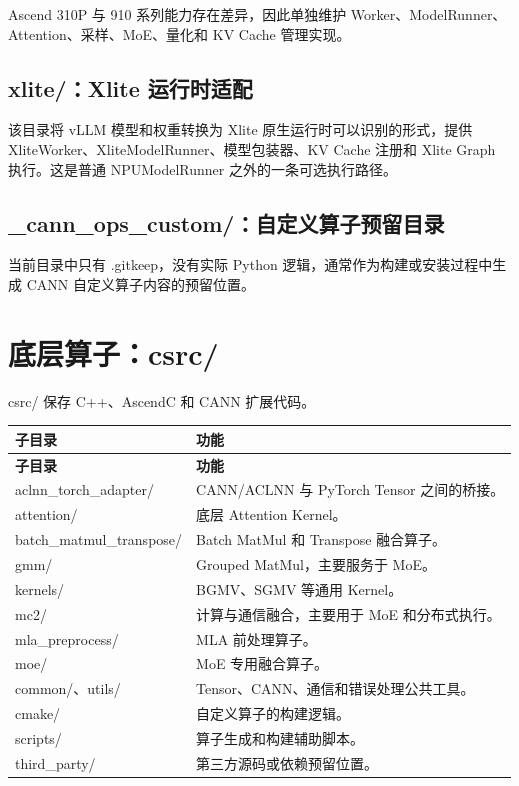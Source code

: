 \documentclass[UTF8,11pt,a4paper]{ctexart}
\DeclareRobustCommand{\folder}[1]{\texttt{\detokenize{#1}}}
\DeclareRobustCommand{\code}[1]{\texttt{\detokenize{#1}}}
\def\folder#1{#1}%
\def\code#1{#1}%
\begin{document}
Ascend 310P 与 910 系列能力存在差异，因此单独维护 Worker、ModelRunner、Attention、采样、MoE、量化和 KV Cache 管理实现。

\subsection{\folder{xlite/}：Xlite 运行时适配}

该目录将 vLLM 模型和权重转换为 Xlite 原生运行时可以识别的形式，提供 \code{XliteWorker}、\code{XliteModelRunner}、模型包装器、KV Cache 注册和 Xlite Graph 执行。这是普通 NPUModelRunner 之外的一条可选执行路径。

\subsection{\folder{_cann_ops_custom/}：自定义算子预留目录}

当前目录中只有 \folder{.gitkeep}，没有实际 Python 逻辑，通常作为构建或安装过程中生成 CANN 自定义算子内容的预留位置。

\section{底层算子：\folder{csrc/}}

\folder{csrc/} 保存 C++、AscendC 和 CANN 扩展代码。

\begin{longtable}{>{\raggedright\arraybackslash}p{} >{\raggedright\arraybackslash}p{}}
\toprule
\textbf{子目录} & \textbf{功能} \\
\midrule
\endfirsthead
\toprule
\textbf{子目录} & \textbf{功能} \\
\midrule
\endhead
\folder{aclnn_torch_adapter/} & CANN/ACLNN 与 PyTorch Tensor 之间的桥接。 \\
\folder{attention/} & 底层 Attention Kernel。 \\
\folder{batch_matmul_transpose/} & Batch MatMul 和 Transpose 融合算子。 \\
\folder{gmm/} & Grouped MatMul，主要服务于 MoE。 \\
\folder{kernels/} & BGMV、SGMV 等通用 Kernel。 \\
\folder{mc2/} & 计算与通信融合，主要用于 MoE 和分布式执行。 \\
\folder{mla_preprocess/} & MLA 前处理算子。 \\
\folder{moe/} & MoE 专用融合算子。 \\
\folder{common/}、\folder{utils/} & Tensor、CANN、通信和错误处理公共工具。 \\
\folder{cmake/} & 自定义算子的构建逻辑。 \\
\folder{scripts/} & 算子生成和构建辅助脚本。 \\
\folder{third_party/} & 第三方源码或依赖预留位置。 \\
\bottomrule
\end{longtable}
\end{document}
